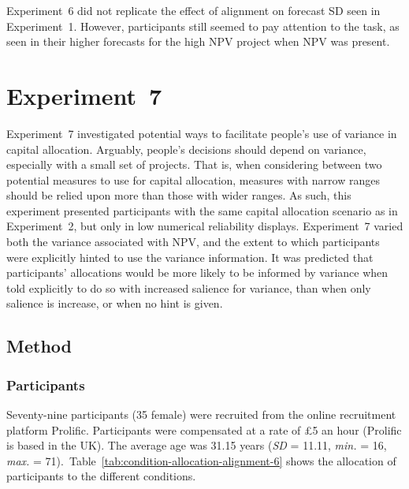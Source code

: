 \documentclass[a4paper, nobind]{templates/ociamthesis}
\theoremstyle{definition}
\theoremstyle{definition}
\theoremstyle{definition}
\theoremstyle{definition}
\theoremstyle{remark}
\begin{document}
Experiment~6 did not replicate the effect of alignment on forecast SD seen in
Experiment~1. However, participants still seemed to pay attention to the task,
as seen in their higher forecasts for the high NPV project when NPV was present.

\hypertarget{alignment-6}{%
\section{Experiment~7}\label{alignment-6}}

Experiment~7 investigated potential ways to facilitate people's use of variance
in capital allocation. Arguably, people's decisions should depend on variance,
especially with a small set of projects. That is, when considering between two
potential measures to use for capital allocation, measures with narrow ranges
should be relied upon more than those with wider ranges. As such, this
experiment presented participants with the same capital allocation scenario as
in Experiment~2, but only in low numerical reliability displays. Experiment~7
varied both the variance associated with NPV, and the extent to which
participants were explicitly hinted to use the variance information. It was
predicted that participants' allocations would be more likely to be informed by
variance when told explicitly to do so with increased salience for variance,
than when only salience is increase, or when no hint is given.

\subsection{Method}

\subsubsection{Participants}

Seventy-nine participants (35 female) were recruited from the online recruitment platform Prolific. Participants were compensated at a rate of \pounds 5 an hour (Prolific is based in the UK). The average age was 31.15 years (\emph{SD} = 11.11, \emph{min.} = 16, \emph{max.} = 71).~Table~\ref{tab:condition-allocation-alignment-6}
shows the allocation of participants to the different conditions.
\end{document}
